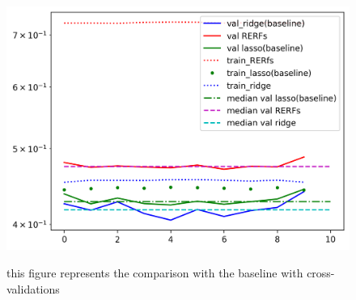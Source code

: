 \documentclass{article}
\begin{document}
\begin{figure}
\includegraphics[scale=1]{compare.png}

this figure represents the comparison with the baseline with cross-validations
\end{figure}
\end{document}
